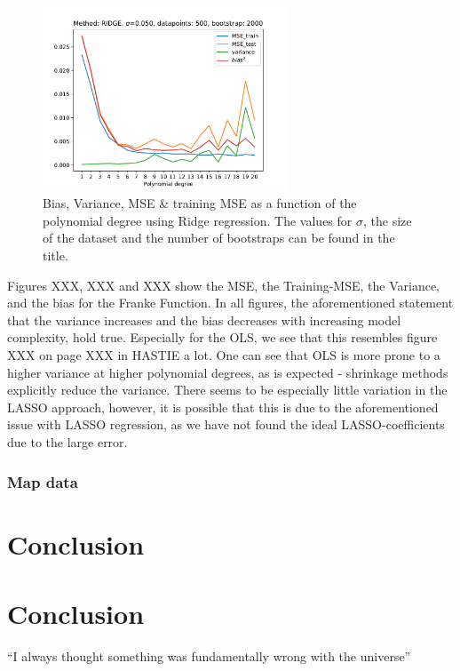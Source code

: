 \documentclass[11pt,a4paper]{article}
\begin{document}
\begin{figure}[H]
\centering
\includegraphics[width=0.65\textwidth]{Bias_Variance_RIDGE.pdf}
\caption[Bias, Variance, MSE & training MSE as a function of the polynomial degree using Ridge regression]{Bias, Variance, MSE & training MSE as a function of the polynomial degree using Ridge regression. The values for $\sigma$, the size of the dataset and the number of bootstraps can be found in the title.}
\label{fig:Ridge_Bias_Variance}
\end{figure}
Figures XXX, XXX and XXX show the MSE, the Training-MSE, the Variance, and the bias for the Franke Function. In all figures, the aforementioned statement that the variance increases and the bias decreases with increasing model complexity, hold true. Especially for the OLS, we see that this resembles  figure XXX on page XXX in HASTIE a lot. One can see that OLS is more prone to a higher variance at higher polynomial degrees, as is expected - shrinkage methods explicitly reduce the variance. There seems to be especially little variation in the LASSO approach, however, it is possible that this is due to the aforementioned issue with LASSO regression, as we have not found the ideal LASSO-coefficients due to the large error.
\subsubsection{Map data}

\section{Conclusion}

\section{Conclusion}
``I always thought something was fundamentally wrong with the universe'' \citep{hastie01statisticallearning}



\end{document}
